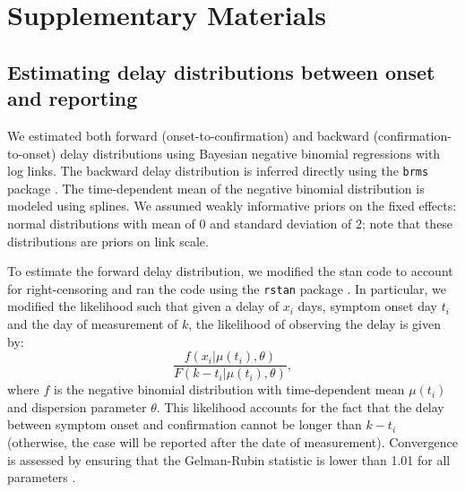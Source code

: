 \documentclass[12pt]{article}
\begin{document}
\pagebreak



\pagebreak

\renewcommand\thefigure{S\arabic{figure}}
\setcounter{figure}{0}    

\section*{Supplementary Materials}

\subsection*{Estimating delay distributions between onset and reporting}

We estimated both forward (onset-to-confirmation) and backward (confirmation-to-onset) delay distributions using Bayesian negative binomial regressions with log links.
The backward delay distribution is inferred directly using the \texttt{brms} package \citep{burkner2017brms}.
The time-dependent mean of the negative binomial distribution is modeled using splines.
We assumed weakly informative priors on the fixed effects: normal distributions with mean of 0 and standard deviation of 2;
note that these distributions are priors on link scale.

To estimate the forward delay distribution, we modified the stan code to account for right-censoring and ran the code using the \texttt{rstan} package \citep{rstan}.
In particular, we modified the likelihood such that given a delay of $x_i$ days, symptom onset day $t_i$ and the day of measurement of $k$, the likelihood of observing the delay is given by:
\begin{equation}
\frac{f(x_i|\mu(t_i), \theta)}{F(k-t_i|\mu(t_i), \theta)},
\end{equation}
where $f$ is the negative binomial distribution with time-dependent mean $\mu(t_i)$ and dispersion parameter $\theta$. This likelihood accounts for the fact that the delay between symptom onset and confirmation cannot be longer than $k-t_i$ (otherwise, the case will be reported after the date of measurement). Convergence is assessed by ensuring that the Gelman-Rubin statistic is lower than 1.01 for all parameters \citep{gelman1992inference}.

\pagebreak
\end{document}
